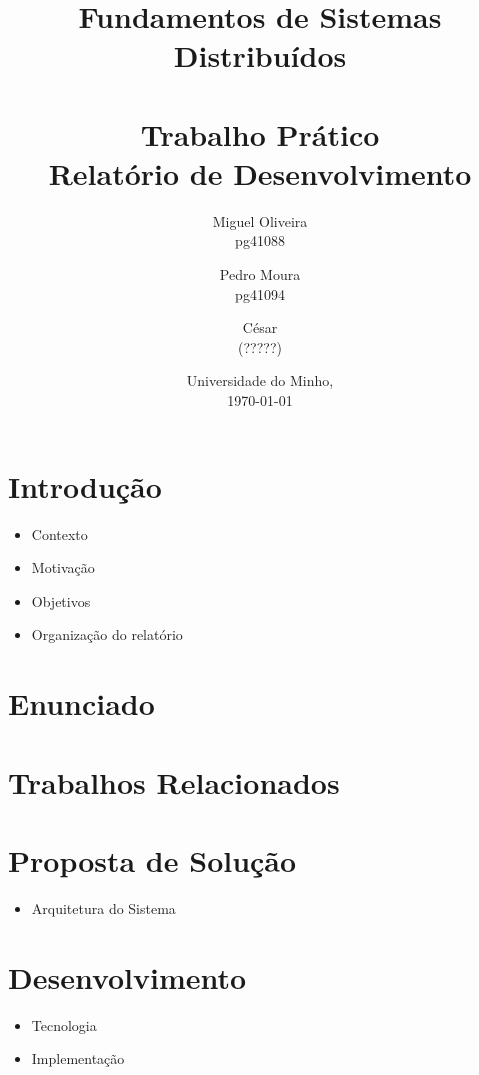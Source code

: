 \documentclass[11pt,a4paper]{report}
\begin{document}
\title{
    Fundamentos de Sistemas Distribuídos\\
    \textbf{\\Trabalho Prático}
    \large{\\Relatório de Desenvolvimento}
}

\author{
    Miguel Oliveira\\ pg41088
    \and Pedro Moura\\ pg41094
    \and César\\ (?????)
}
\date{Universidade do Minho,\\\today}

\maketitle


\tableofcontents


\chapter{Introdução}
\begin{itemize}
    \item Contexto
    \item Motivação
    \item Objetivos
    \item Organização do relatório
\end{itemize}


\chapter{Enunciado}


\chapter{Trabalhos Relacionados}


\chapter{Proposta de Solução}
\begin{itemize}
    \item Arquitetura do Sistema
\end{itemize}


\chapter{Desenvolvimento}
\begin{itemize}
    \item Tecnologia
    \item Implementação
\end{itemize}
\end{document}
